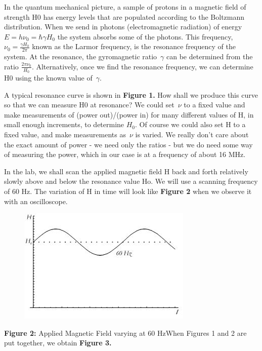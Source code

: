 \documentclass{../lab}
\begin{document}
In the quantum mechanical picture, a sample of protons in a magnetic field of strength H0 has energy levels that are populated according to the Boltzmann distribution. When we send in photons (electromagnetic radiation) of energy $ E = h\nu_0 = \hbar \gamma H_0 $ the system absorbs some of the photons. This frequency, $ \nu_0 = \frac {\gamma H_0} {2 \pi} $ known as the Larmor frequency, is the resonance frequency of the system. At the resonance, the gyromagnetic ratio $ \!\,\gamma $ can be determined from the ratio $ \frac {2 \pi \nu_0} {H_0} $. Alternatively, once we find the resonance frequency, we can determine H0 using the known value of $ \!\,\gamma $.

A typical resonance curve is shown in \textbf{Figure 1.} How shall we produce this curve so that we can measure H0 at resonance? We could set $ \!\,\nu $ to a fixed value and make measurements of (power out)/(power in) for many different values of H, in small enough increments, to determine $H_0$. Of course we could also set H to a fixed value, and make measurements as $ \!\,\nu $ is varied. We really don't care about the exact amount of power - we need only the ratios - but we do need some way of measuring the power, which in our case is at a frequency of about 16 MHz.

In the lab, we shall scan the applied magnetic field H back and forth relatively slowly above and below the resonance value Ho. We will use a scanning frequency of 60 Hz. The variation of H in time will look like \textbf{Figure 2} when we observe it with an oscilloscope.

\begin{figure}[h]
    \centering
    \href{http://experimentationlab.berkeley.edu/sites/default/files/images/NMR5.jpg}{\includegraphics[width=0.5\linewidth]{images/NMR5.jpg}}
    \caption{}
    \label{fig:NMR5}
\end{figure}




\textbf{Figure 2:} Applied Magnetic Field varying at 60 HzWhen Figures 1 and 2 are put together, we obtain \textbf{Figure 3.}
\end{document}
